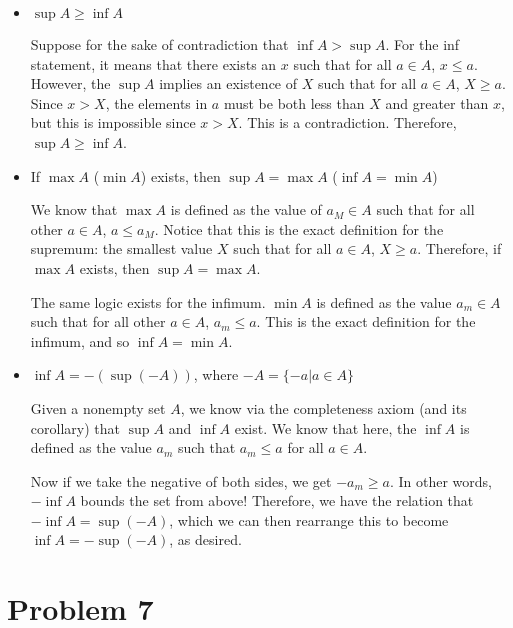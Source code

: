 \documentclass[10pt]{article}
\begin{document}
    \begin{itemize}
        \item $\sup A \ge \inf A$
        
        \begin{solution}
            Suppose for the sake of contradiction that $\inf A > \sup A$. For the inf statement, it means that there exists an $x$ such that for all $a \in A$, $x \le a$. However, the $\sup A$ implies an existence of $X$ such that for all $a \in A$, $X \ge a$. Since $x > X$, the elements in $a$ must be both less than $X$ and greater than $x$, but this is impossible since $x > X$. This is a contradiction. Therefore, $\sup A \ge \inf A$.
        \end{solution}
        \item If $\max A$ ($\min A$) exists, then $\sup A = \max A$ ($\inf A = \min A$)
        
        \begin{solution}
            We know that $\max A$ is defined as the value of $a_M \in A$ such that for all other $a \in A$, $a \le a_M$. Notice that this is the exact definition for the supremum: the smallest value $X$ such that for all $a \in A$, $X \ge a$. Therefore, if $\max A$ exists, then $\sup A = \max A$. 

            The same logic exists for the infimum. $\min A$ is defined as the value $a_m \in A$ such that for all other $a \in A$, $a_m \le a$. This is the exact definition for the infimum, and so $\inf A = \min A$.
        \end{solution}
        \item $\inf A = -(\sup (-A))$, where $-A = \{ -a \vert a \in A\}$
        
        \begin{solution}
            Given a nonempty set $A$, we know via the completeness axiom (and its corollary) that $\sup A$ and $\inf A$ exist. We know that here, the $\inf A$ is defined as the value $a_m$ such that $a_m \le a$ for all $a \in A$. 

            Now if we take the negative of both sides, we get $-a_m \ge a$. In other words, $-\inf A$ bounds the set from above! Therefore, we have the relation that $-\inf A = \sup (-A)$, which we can then rearrange this to become $\inf A = -\sup(-A)$, as desired.
        \end{solution}
    \end{itemize}

    \pagebreak

    \section*{Problem 7}
\end{document}
